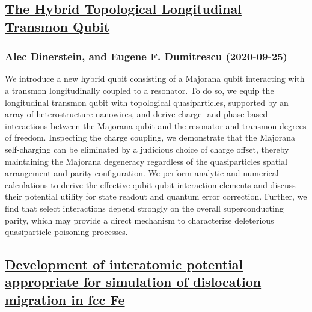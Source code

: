 \subsection*{\href{http://arxiv.org/abs/2009.12278v1}{The Hybrid Topological Longitudinal Transmon Qubit}}
\subsubsection*{Alec Dinerstein, and Eugene F. Dumitrescu (2020-09-25)}
We introduce a new hybrid qubit consisting of a Majorana qubit interacting
with a transmon longitudinally coupled to a resonator. To do so, we equip the
longitudinal transmon qubit with topological quasiparticles, supported by an
array of heterostructure nanowires, and derive charge- and phase-based
interactions between the Majorana qubit and the resonator and transmon degrees
of freedom. Inspecting the charge coupling, we demonstrate that the Majorana
self-charging can be eliminated by a judicious choice of charge offset, thereby
maintaining the Majorana degeneracy regardless of the quasiparticles spatial
arrangement and parity configuration. We perform analytic and numerical
calculations to derive the effective qubit-qubit interaction elements and
discuss their potential utility for state readout and quantum error correction.
Further, we find that select interactions depend strongly on the overall
superconducting parity, which may provide a direct mechanism to characterize
deleterious quasiparticle poisoning processes.

\subsection*{\href{http://arxiv.org/abs/2009.12265v1}{Development of interatomic potential appropriate for simulation of  dislocation migration in fcc Fe}}
